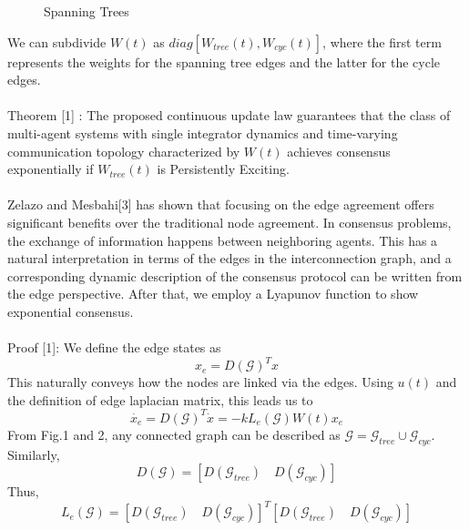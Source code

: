 \documentclass[journal]{IEEEtran}
\begin{document}
\begin{figure}[h]
\caption{Spanning  Trees}
\end{figure}
We can subdivide $W(t)$ as $diag[W_{tree}(t), W_{cyc}(t)]$, where the first term represents the weights for the spanning tree edges and the latter for the cycle edges.\\\\ Theorem [1] : The proposed continuous update law guarantees that the class of multi-agent systems with single integrator dynamics and time-varying communication topology characterized by $W(t)$ achieves consensus exponentially if $W_{tree}(t)$ is Persistently Exciting. \\\\ Zelazo and Mesbahi[3] has shown that focusing on the edge agreement offers significant benefits over the traditional node agreement.  In consensus problems, the exchange of information happens between neighboring agents. This has a natural interpretation in terms of the edges in the interconnection graph, and a corresponding dynamic description of the consensus protocol can be written from the edge perspective. After that, we employ a Lyapunov function to show exponential consensus. \\\\Proof [1]: We define the edge states as \begin{equation}x_e = D(\mathcal{G})^Tx\end{equation} This naturally conveys how the nodes are linked via the edges. Using $u(t)$ and the definition of edge laplacian matrix, this leads us to \begin{equation}\dot{x_e} = D(\mathcal{G})^T\dot{x} = -kL_e(\mathcal{G})W(t)x_e \end{equation}From Fig.1 and 2, any connected graph can be described as  $\mathcal{G} = \mathcal{G}_{tree} \cup \mathcal{G}_{cyc} $. Similarly, \begin{equation} D(\mathcal{G}) = [D(\mathcal{G}_{tree}) \quad D(\mathcal{G}_{cyc})] \end{equation}Thus, \begin{equation}L_e(\mathcal{G}) = [D(\mathcal{G}_{tree}) \quad D(\mathcal{G}_{cyc})]^T[D(\mathcal{G}_{tree}) \quad D(\mathcal{G}_{cyc})] \end{equation}
\end{document}
